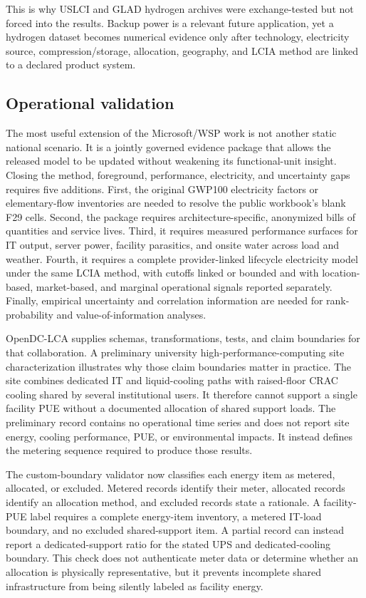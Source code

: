 \documentclass[review,12pt]{elsarticle}
\begin{document}
This is why USLCI and GLAD hydrogen archives were exchange-tested but not forced into the results. Backup power is a relevant future application, yet a hydrogen dataset becomes numerical evidence only after technology, electricity source, compression/storage, allocation, geography, and LCIA method are linked to a declared product system.

\subsection{Operational validation}
The most useful extension of the Microsoft/WSP work is not another static national scenario. It is a jointly governed evidence package that allows the released model to be updated without weakening its functional-unit insight. Closing the method, foreground, performance, electricity, and uncertainty gaps requires five additions. First, the original GWP100 electricity factors or elementary-flow inventories are needed to resolve the public workbook's blank F29 cells. Second, the package requires architecture-specific, anonymized bills of quantities and service lives. Third, it requires measured performance surfaces for IT output, server power, facility parasitics, and onsite water across load and weather. Fourth, it requires a complete provider-linked lifecycle electricity model under the same LCIA method, with cutoffs linked or bounded and with location-based, market-based, and marginal operational signals reported separately. Finally, empirical uncertainty and correlation information are needed for rank-probability and value-of-information analyses.

OpenDC-LCA supplies schemas, transformations, tests, and claim boundaries for that collaboration. A preliminary university high-performance-computing site characterization illustrates why those claim boundaries matter in practice. The site combines dedicated IT and liquid-cooling paths with raised-floor CRAC cooling shared by several institutional users. It therefore cannot support a single facility PUE without a documented allocation of shared support loads. The preliminary record contains no operational time series and does not report site energy, cooling performance, PUE, or environmental impacts. It instead defines the metering sequence required to produce those results.

The custom-boundary validator now classifies each energy item as metered, allocated, or excluded. Metered records identify their meter, allocated records identify an allocation method, and excluded records state a rationale. A facility-PUE label requires a complete energy-item inventory, a metered IT-load boundary, and no excluded shared-support item. A partial record can instead report a dedicated-support ratio for the stated UPS and dedicated-cooling boundary. This check does not authenticate meter data or determine whether an allocation is physically representative, but it prevents incomplete shared infrastructure from being silently labeled as facility energy.
\end{document}
